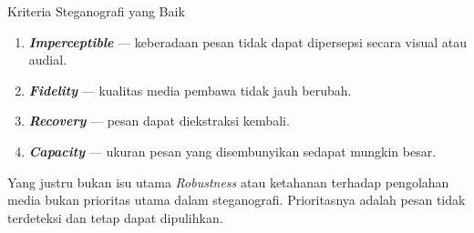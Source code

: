 \documentclass[aspectratio=169,11pt]{beamer}
\begin{document}
\begin{frame}{Kriteria Steganografi yang Baik}
    \begin{enumerate}
        \item \textbf{\textit{Imperceptible}} --- keberadaan pesan tidak dapat
              dipersepsi secara visual atau audial.
        \item \textbf{\textit{Fidelity}} --- kualitas media pembawa tidak jauh
              berubah.
        \item \textbf{\textit{Recovery}} --- pesan dapat diekstraksi kembali.
        \item \textbf{\textit{Capacity}} --- ukuran pesan yang disembunyikan
              sedapat mungkin besar.
    \end{enumerate}
    \vspace{0.15cm}
    \begin{alertblock}{Yang justru bukan isu utama}
        \footnotesize
        \textit{Robustness} atau ketahanan terhadap pengolahan media bukan
        prioritas utama dalam steganografi. Prioritasnya adalah pesan tidak
        terdeteksi dan tetap dapat dipulihkan.
    \end{alertblock}
\end{frame}
\end{document}
